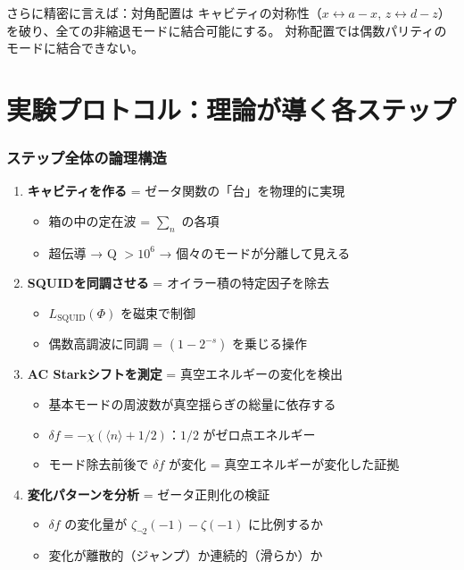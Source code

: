\documentclass[12pt,a4paper]{article}
\begin{document}
さらに精密に言えば：対角配置は
キャビティの対称性（$x \leftrightarrow a-x$, $z \leftrightarrow d-z$）
を破り、全ての非縮退モードに結合可能にする。
対称配置では偶数パリティのモードに結合できない。

\part{実験プロトコル：理論が導く各ステップ}

\section{ステップ全体の論理構造}

\begin{deepbox}[実験の論理チェーン]
\begin{enumerate}
\item \textbf{キャビティを作る} = ゼータ関数の「台」を物理的に実現
  \begin{itemize}
  \item 箱の中の定在波 = $\sum_n$ の各項
  \item 超伝導 → Q $> 10^6$ → 個々のモードが分離して見える
  \end{itemize}

\item \textbf{SQUIDを同調させる} = オイラー積の特定因子を除去
  \begin{itemize}
  \item $L_{\mathrm{SQUID}}(\Phi)$ を磁束で制御
  \item 偶数高調波に同調 = $(1-2^{-s})$ を乗じる操作
  \end{itemize}

\item \textbf{AC Starkシフトを測定} = 真空エネルギーの変化を検出
  \begin{itemize}
  \item 基本モードの周波数が真空揺らぎの総量に依存する
  \item $\delta f = -\chi(\langle n \rangle + 1/2)$：$1/2$ がゼロ点エネルギー
  \item モード除去前後で $\delta f$ が変化 = 真空エネルギーが変化した証拠
  \end{itemize}

\item \textbf{変化パターンを分析} = ゼータ正則化の検証
  \begin{itemize}
  \item $\delta f$ の変化量が $\zeta_{\neg 2}(-1) - \zeta(-1)$ に比例するか
  \item 変化が離散的（ジャンプ）か連続的（滑らか）か
  \end{itemize}
\end{enumerate}
\end{deepbox}
\end{document}
